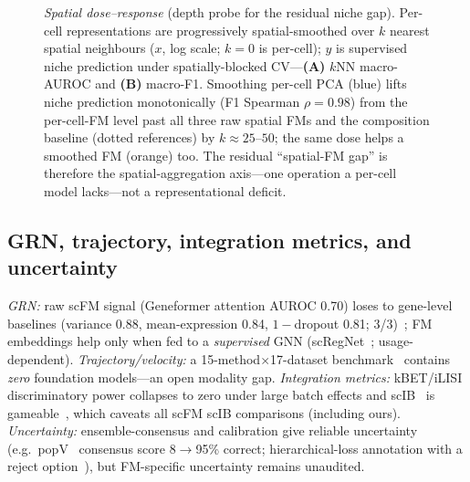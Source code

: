 \documentclass[11pt]{article}
\begin{document}
\begin{figure}[htb]\centering
\caption{\emph{Spatial dose--response} (depth probe for the residual niche gap). Per-cell representations are progressively spatial-smoothed over $k$ nearest spatial neighbours ($x$, log scale; $k{=}0$ is per-cell); $y$ is supervised niche prediction under spatially-blocked CV---\textbf{(A)} $k$NN macro-AUROC and \textbf{(B)} macro-F1. Smoothing per-cell PCA (blue) lifts niche prediction monotonically (F1 Spearman $\rho=0.98$) from the per-cell-FM level past all three raw spatial FMs and the composition baseline (dotted references) by $k\approx25$--$50$; the same dose helps a smoothed FM (orange) too. The residual ``spatial-FM gap'' is therefore the spatial-aggregation axis---one operation a per-cell model lacks---not a representational deficit.}\label{fig:spatialdose}\end{figure}

\subsection{GRN, trajectory, integration metrics, and uncertainty}
\emph{GRN:} raw scFM signal (Geneformer attention AUROC 0.70) loses to gene-level baselines (variance 0.88, mean-expression 0.84, $1-$dropout 0.81; 3/3)~\cite{kendiukhov2026}; FM embeddings help only when fed to a \emph{supervised} GNN (scRegNet~\cite{scregnet2025}; usage-dependent). \emph{Trajectory/velocity:} a 15-method$\times$17-dataset benchmark~\cite{velobench2026} contains \emph{zero} foundation models---an open modality gap. \emph{Integration metrics:} kBET/iLISI discriminatory power collapses to zero under large batch effects and scIB~\cite{luecken2022} is gameable~\cite{rbet2025,scibe2025}, which caveats all scFM scIB comparisons (including ours). \emph{Uncertainty:} ensemble-consensus and calibration give reliable uncertainty (e.g.\ popV~\cite{popv2024} consensus score 8$\to$95\% correct; hierarchical-loss annotation with a reject option~\cite{hce2026,theunissen2024}), but FM-specific uncertainty remains unaudited.
\end{document}
